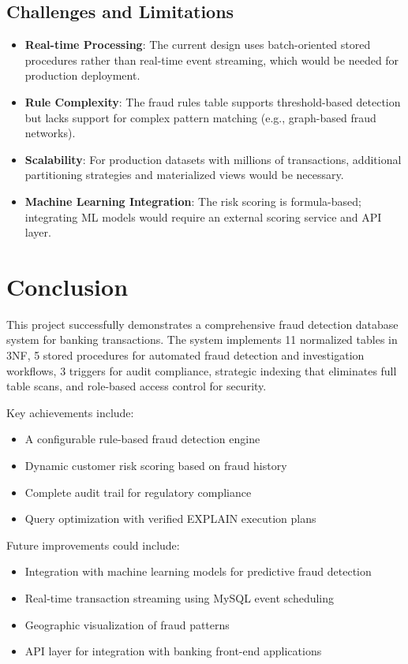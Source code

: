 \documentclass[a4paper,12pt]{article}
\begin{document}
\subsection{Challenges and Limitations}
\begin{itemize}
    \item \textbf{Real-time Processing}: The current design uses batch-oriented stored procedures rather than real-time event streaming, which would be needed for production deployment.
    \item \textbf{Rule Complexity}: The fraud rules table supports threshold-based detection but lacks support for complex pattern matching (e.g., graph-based fraud networks).
    \item \textbf{Scalability}: For production datasets with millions of transactions, additional partitioning strategies and materialized views would be necessary.
    \item \textbf{Machine Learning Integration}: The risk scoring is formula-based; integrating ML models would require an external scoring service and API layer.
\end{itemize}

\newpage
\section{Conclusion}

This project successfully demonstrates a comprehensive fraud detection database system for banking transactions. The system implements 11 normalized tables in 3NF, 5 stored procedures for automated fraud detection and investigation workflows, 3 triggers for audit compliance, strategic indexing that eliminates full table scans, and role-based access control for security.

Key achievements include:
\begin{itemize}
    \item A configurable rule-based fraud detection engine
    \item Dynamic customer risk scoring based on fraud history
    \item Complete audit trail for regulatory compliance
    \item Query optimization with verified EXPLAIN execution plans
\end{itemize}

Future improvements could include:
\begin{itemize}
    \item Integration with machine learning models for predictive fraud detection
    \item Real-time transaction streaming using MySQL event scheduling
    \item Geographic visualization of fraud patterns
    \item API layer for integration with banking front-end applications
\end{itemize}
\end{document}

